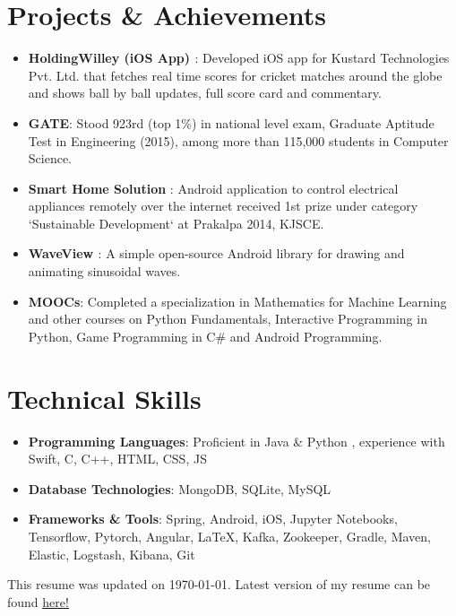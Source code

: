 \documentclass[letterpaper,11pt]{article}
\newcommand{\resumeItem}[2]{
	\item\normalsize{
		\textbf{#1}{: #2}
	}
}
\newcommand{\resumeSubItem}[2]{\resumeItem{#1}{#2}\vspace{-4pt}}
\newcommand{\resumeSubHeadingListStart}{\begin{itemize}[leftmargin=*]}
\newcommand{\resumeSubHeadingListEnd}{\end{itemize}}
\begin{document}
	\section{Projects \& Achievements}
	\resumeSubHeadingListStart
	\resumeSubItem{HoldingWilley (iOS App) \href{https://apps.apple.com/app/id1229976116}{\faApple}}
	{Developed iOS app for Kustard Technologies Pvt. Ltd. that fetches real time scores for cricket matches around the globe and shows ball by ball updates, full score card and  commentary.}
	\resumeSubItem{GATE}
	{Stood 923rd (top 1\%) in national level exam, Graduate Aptitude Test in Engineering (2015), among more than 115,000 students in Computer Science.}
	\resumeSubItem{Smart Home Solution \faAndroid}
	{Android application to control electrical appliances remotely over the internet received 1st prize under category ‘Sustainable Development‘ at Prakalpa 2014, KJSCE.}
	\resumeSubItem{WaveView \href{https://github.com/narayanacharya6/WaveView}{\faGithub}}
	{A simple open-source Android library for drawing and animating sinusoidal waves.}
	\resumeSubItem{MOOCs}
	{Completed a specialization in Mathematics for Machine Learning and other courses on Python Fundamentals, Interactive Programming in Python, Game Programming in C\# and Android Programming.}
	\resumeSubHeadingListEnd
	
	
	\section{Technical Skills}
	\resumeSubHeadingListStart
	\item{
		\textbf{Programming Languages}{: Proficient in Java \& Python , experience with Swift, C, C++, HTML, CSS, JS}}
	\vspace{-8pt}
	\item{
		\textbf{Database Technologies}{: MongoDB, SQLite, MySQL}}
	\vspace{-8pt}
	\item{
		\textbf{Frameworks \& Tools}{: Spring, Android, iOS, Jupyter Notebooks, Tensorflow, Pytorch, Angular, \LaTeX, Kafka, Zookeeper, Gradle, Maven, Elastic, Logstash, Kibana, Git}}
	\resumeSubHeadingListEnd
	
	\begin{center}
		\small This resume was updated on \today. Latest version of my resume can be found \href{https://github.com/narayanacharya6/Resume/raw/master/NarayanAcharyaResume.pdf}{\underline{here!}}
	\end{center}
	
	
\end{document}

